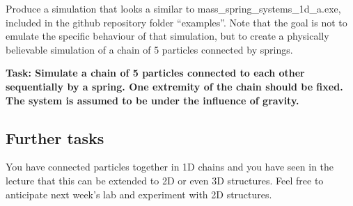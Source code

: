 \documentclass[12pt]{article}
\begin{document}
Produce a simulation that looks a similar to mass\_spring\_systems\_1d\_a.exe, included in the github repository folder ``examples''. Note that the goal is not to emulate the specific behaviour of that simulation, but to create a physically believable simulation of a chain of 5 particles connected by springs.

\textbf{Task: Simulate a chain of 5 particles connected to each other sequentially by a spring. One extremity of the chain should be fixed. The system is assumed to be under the influence of gravity.}

\subsection*{Further tasks}

You have connected particles together in 1D chains and you have seen in the lecture that this can be extended to 2D or even 3D structures. Feel free to anticipate next week’s lab and experiment with 2D structures.


\end{document}
